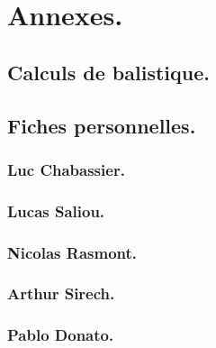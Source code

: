 \documentclass{report}
\begin{document}
\part{Annexes.}
\appendix
\chapter{Calculs de balistique.} \label{balis}


\chapter{Fiches personnelles.}
\section{Luc Chabassier.}

\section{Lucas Saliou.}

\section{Nicolas Rasmont.}

\section{Arthur Sirech.}

\section{Pablo Donato.}


\newpage
\listoffigures
{}
\end{document}
